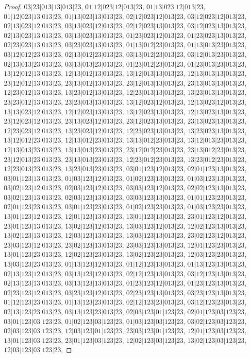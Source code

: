 \documentclass[12pt]{article}
\theoremstyle{plain}
\theoremstyle{definition}
\theoremstyle{remark}
\begin{document}
\begin{proof}
$03|23|013|13|013|23$, $01|12|023|12|013|23$, $01|13|023|12|013|23$, $01|12|023|13|013|23$, $01|13|023|13|013|23$, $02|12|023|12|013|23$, $03|12|023|12|013|23$, $02|13|023|12|013|23$, $03|13|023|12|013|23$, $02|12|023|13|013|23$, $03|12|023|13|013|23$, $02|13|023|13|013|23$, $03|13|023|13|013|23$, $01|23|023|12|013|23$, $01|23|023|13|013|23$, $02|23|023|13|013|23$, $03|23|023|13|013|23$, $01|13|012|23|013|23$, $01|13|013|23|013|23$, $03|12|012|23|013|23$, $02|13|012|23|013|23$, $03|13|012|23|013|23$, $03|12|013|23|013|23$, $02|13|013|23|013|23$, $03|13|013|23|013|23$, $01|23|012|23|013|23$, $01|23|013|23|013|23$, $13|12|012|13|013|23$, $12|13|012|13|013|23$, $13|12|013|13|013|23$, $12|13|013|13|013|23$, $23|12|012|13|013|23$, $23|13|012|13|013|23$, $23|12|013|13|013|23$, $23|13|013|13|013|23$, $12|23|012|13|013|23$, $13|23|012|13|013|23$, $12|23|013|13|013|23$, $13|23|013|13|013|23$, $23|23|012|13|013|23$, $23|23|013|13|013|23$, $13|12|023|12|013|23$, $12|13|023|12|013|23$, $13|13|023|12|013|23$, $12|12|023|13|013|23$, $13|12|023|13|013|23$, $12|13|023|13|013|23$, $23|12|023|12|013|23$, $23|13|023|12|013|23$, $23|12|023|13|013|23$, $23|13|023|13|013|23$, $12|23|023|12|013|23$, $13|23|023|12|013|23$, $12|23|023|13|013|23$, $13|23|023|13|013|23$, $13|12|012|23|013|23$, $12|13|012|23|013|23$, $13|13|012|23|013|23$, $13|12|013|23|013|23$, $12|13|013|23|013|23$, $13|13|013|23|013|23$, $23|12|012|23|013|23$, $23|13|012|23|013|23$, $23|12|013|23|013|23$, $23|13|013|23|013|23$, $12|23|012|23|013|23$, $13|23|012|23|013|23$, $12|23|013|23|013|23$, $13|23|013|23|013|23$, $03|01|123|12|013|23$, $02|01|123|13|013|23$, $03|01|123|13|013|23$, $01|03|123|12|013|23$, $01|02|123|13|013|23$, $01|03|123|13|013|23$, $03|02|123|12|013|23$, $02|03|123|12|013|23$, $03|03|123|12|013|23$, $02|02|123|13|013|23$, $03|02|123|13|013|23$, $02|03|123|13|013|23$, $03|03|123|13|013|23$, $01|01|123|23|013|23$, $02|01|123|23|013|23$, $03|01|123|23|013|23$, $01|02|123|23|013|23$, $01|03|123|23|013|23$, $13|01|123|12|013|23$, $12|01|123|13|013|23$, $13|01|123|13|013|23$, $23|01|123|12|013|23$, $23|01|123|13|013|23$, $13|02|123|12|013|23$, $13|03|123|12|013|23$, $12|02|123|13|013|23$, $13|02|123|13|013|23$, $12|03|123|13|013|23$, $13|03|123|13|013|23$, $23|02|123|12|013|23$, $23|03|123|12|013|23$, $23|02|123|13|013|23$, $23|03|123|13|013|23$, $12|01|123|23|013|23$, $13|01|123|23|013|23$, $12|02|123|23|013|23$, $13|02|123|23|013|23$, $12|03|123|23|013|23$, $13|03|123|23|013|23$, $01|13|123|12|013|23$, $01|12|123|13|013|23$, $01|13|123|13|013|23$, $02|13|123|12|013|23$, $03|13|123|12|013|23$, $02|12|123|13|013|23$, $03|12|123|13|013|23$, $02|13|123|13|013|23$, $03|13|123|13|013|23$, $01|23|123|12|013|23$, $01|23|123|13|013|23$, $02|23|123|12|013|23$, $03|23|123|12|013|23$, $02|23|123|13|013|23$, $03|23|123|13|013|23$, $01|12|123|23|013|23$, $01|13|123|23|013|23$, $02|12|123|23|013|23$, $03|12|123|23|013|23$, $02|13|123|23|013|23$, $03|13|123|23|013|23$, $02|03|123|01|123|23$, $02|01|123|03|123|23$, $03|01|123|03|123|23$, $01|02|123|03|123|23$, $01|03|123|03|123|23$, $03|02|123|03|123|23$, $02|03|123|03|123|23$, $12|03|123|01|123|23$, $23|03|123|01|123|23$, $12|01|123|03|123|23$, $13|01|123|03|123|23$, $23|01|123|03|123|23$, $12|02|123|03|123|23$, $13|02|123|03|123|23$, $12|03|123|03|123|23$, 
\end{proof}
\end{document}
